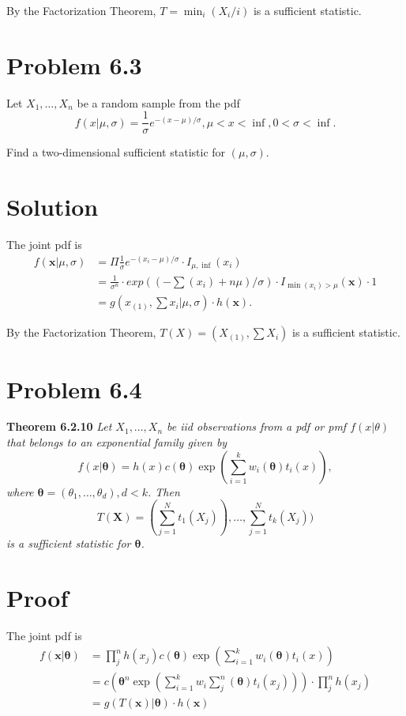 \documentclass{article} %
\newcommand{\sample}[1]{#1_1 , \dots , #1_n}
\newcommand{\solution}[1]{\section*{Solution #1}}
\begin{document}
By the Factorization Theorem, $T = \min_i (X_i/i)$ is a sufficient statistic.

\section*{Problem 6.3}
Let $\sample{X}$ be a random sample from the pdf
\begin{equation*}
f(x| \mu, \sigma) =  \frac1\sigma e^{-(x- \mu)/\sigma}, \mu < x < \inf, 0 < \sigma < \inf.   
\end{equation*}

Find a two-dimensional sufficient statistic for $(\mu, \sigma)$.

\solution{}
The joint pdf is
\begin{align*}
    f(\mathbf{x}|\mu, \sigma) &= \Pi \frac1\sigma e^{-(x_i- \mu)/\sigma} \cdot I_{\mu, \inf} (x_i) \\
    &=\frac{1}{\sigma^n} \cdot exp((-\sum(x_i) + n\mu)/ \sigma) \cdot I_{\min(x_i) > \mu} (\mathbf{x}) \cdot 1 \\
    &= g(x_{(1)}, \sum x_i | \mu, \sigma) \cdot h(\mathbf{x}).
\end{align*}

By the Factorization Theorem, $T(X) = (X_{(1)}, \sum X_i)$ is a sufficient statistic.


\section*{Problem 6.4}
\textbf{Theorem 6.2.10} \textit{Let $\sample{X}$ be iid observations from a pdf or pmf $f(x|\theta)$ that belongs to an exponential family given by
$$f(x|\boldsymbol\theta) = h(x)c(\boldsymbol\theta)\exp(\sum \limits_{i=1}^k w_i(\boldsymbol\theta)t_i(x)),$$
where $\boldsymbol\theta = (\theta_1, \dots, \theta_d), d < k$. Then
$$T(\boldsymbol X) = (\sum \limits_{j=1}^N t_1(X_j)), \dots, \sum \limits_{j=1}^N t_k(X_j))$$
is a sufficient statistic for $\boldsymbol\theta$.} \\

\section*{Proof}
The joint pdf is 
\begin{align*}
    f(\mathbf{x}|\boldsymbol{\theta}) &= \prod \limits_j^n {h(x_j)c(\boldsymbol\theta)\exp(\sum \limits_{i=1}^k w_i(\boldsymbol\theta)t_i(x))} \\
    &= c(\boldsymbol\theta^n \exp(\sum \limits_{i=1}^k w_i \sum \limits_j^n(\boldsymbol\theta)t_i(x_j))) \cdot \prod \limits_j^n h(x_j) \\
    &= g(T(\boldsymbol x)|\boldsymbol \theta) \cdot h(\boldsymbol x)
\end{align*}
\end{document}
